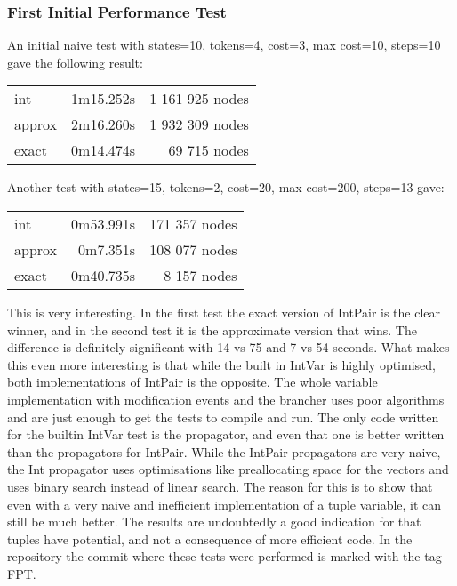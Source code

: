 \documentclass[a4paper,11pt]{article}
\begin{document}
\subsubsection{First Initial Performance Test}
An initial naive test with states=10, tokens=4, cost=3, max cost=10, steps=10 gave the following result:
\newline
\newline
\begin{tabular}{l r r}
int & 1m15.252s & 1 161 925 nodes\\
approx & 2m16.260s & 1 932 309 nodes\\ 
exact & 0m14.474s & 69 715 nodes \\
\end{tabular}
\newline
\newline
Another test with states=15, tokens=2, cost=20, max cost=200, steps=13 gave:
\newline
\newline
\begin{tabular}{l r r}
int & 0m53.991s &  171 357 nodes\\
approx & 0m7.351s & 108 077 nodes\\ 
exact & 0m40.735s & 8 157 nodes\\
\end{tabular}
\newline
\newline
This is very interesting. In the first test the exact version of IntPair is the clear winner, and in the second test it is the approximate version that wins. The difference is definitely significant with 14 vs 75 and 7 vs 54 seconds. What makes this even more interesting is that while the built in IntVar is highly optimised, both implementations of IntPair is the opposite. The whole variable implementation with modification events and the brancher uses poor algorithms and are just enough to get the tests to compile and run. The only code written for the builtin IntVar test is the propagator, and even that one is better written than the propagators for IntPair. While the IntPair propagators are very naive, the Int propagator uses optimisations like preallocating space for the vectors and uses binary search instead of linear search. The reason for this is to show that even with a very naive and inefficient implementation of a tuple variable, it can still be much better. The results are undoubtedly a good indication for that tuples have potential, and not a consequence of more efficient code. In the repository the commit where these tests were performed is marked with the tag FPT.
\end{document}
